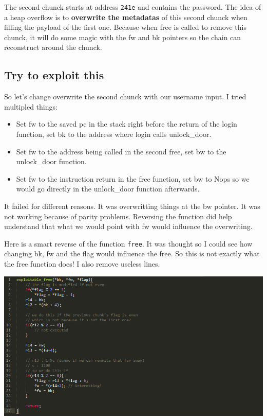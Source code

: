 \documentclass[a4paper,11pt]{article}
\begin{document}
The second chunck starts at address \texttt{241e} and contains the
password. The idea of a heap overflow is to \textbf{overwrite the
metadatas} of this second chunck when filling the payload of the first
one. Because when free is called to remove this chunck, it will do some
magic with the fw and bk pointers so the chain can reconstruct around
the chunck.

\subsection{Try to exploit this}\label{try-to-exploit-this}

So let's change overwrite the second chunck with our username input. I
tried multipled things:

\begin{itemize}
\itemsep1pt\parskip0pt
\item
  Set fw to the saved pc in the stack right before the return of the
  login function, set bk to the address where login calls unlock\_door.
\item
  Set fw to the address being called in the second free, set bw to the
  unlock\_door function.
\item
  Set fw to the instruction return in the free function, set bw to Nops
  so we would go directly in the unlock\_door function afterwards.
\end{itemize}

It failed for different reasons. It was overwritting things at the bw
pointer. It was not working because of parity problems. Reversing the
function did help understand that what we would point with fw would
influence the overwriting.

Here is a smart reverse of the function \texttt{free}. It was thought so
I could see how changing bk, fw and the flag would influence the free.
So this is not exactly what the free function does! I also remove
useless lines.

\includegraphics{img/code2_final.PNG}
\end{document}

